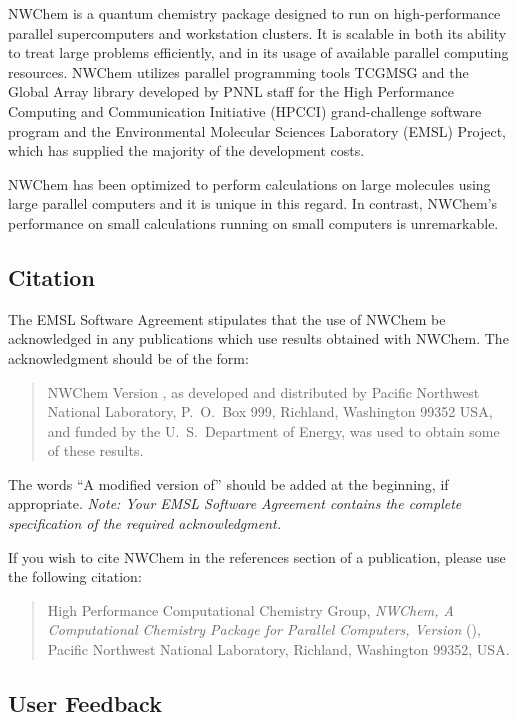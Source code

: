 

NWChem is a quantum chemistry package
designed to run on high-performance parallel supercomputers and
workstation clusters.  It is scalable in both its ability to
treat large problems efficiently, and in its usage of available
parallel computing resources.  NWChem utilizes parallel programming
tools TCGMSG and the Global Array library developed by PNNL staff
for the High Performance Computing and
Communication Initiative (HPCCI) grand-challenge software program and
the Environmental Molecular Sciences Laboratory (EMSL) Project, which
has supplied the majority of the development costs.

NWChem has been optimized to perform calculations on large molecules
using large parallel computers and it is unique in this regard.  In
contrast, NWChem's performance on small calculations running on
small computers is unremarkable.

\subsection{Citation}

The EMSL Software Agreement stipulates that the use of NWChem be
acknowledged in any publications which use results obtained with
NWChem.  The acknowledgment should be of the form:
\begin{quote}

  NWChem Version \nwchemversion, as developed and distributed by
  Pacific Northwest National Laboratory, P.~O.~Box 999, Richland,
  Washington 99352 USA, and funded by the U.~S.~Department of Energy,
  was used to obtain some of these results.
\end{quote}

The words ``A modified version of'' should be added at the beginning,
if appropriate.  {\em Note: Your EMSL Software Agreement contains the
complete specification of the required acknowledgment.}

If you wish to cite NWChem in the references section of a publication,
please use the following citation:
\begin{quote}
  High Performance Computational Chemistry Group, {\em NWChem, A
   Computational Chemistry Package for Parallel Computers, Version
    \nwchemversion{}} (\nwchemyear), Pacific Northwest National
  Laboratory, Richland, Washington 99352, USA.
\end{quote}

\subsection{User Feedback}

